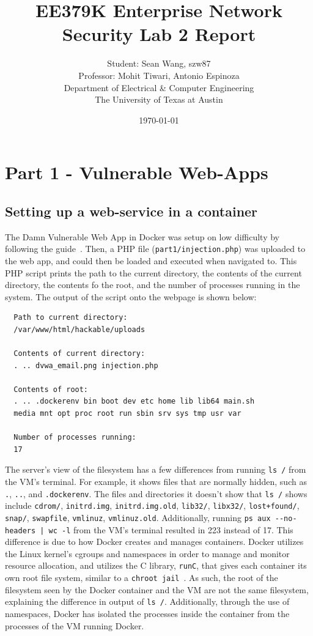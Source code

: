 \documentclass[11pt]{article}
\author{Student: Sean Wang, szw87 \\ Professor: Mohit Tiwari, Antonio Espinoza \\ Department of Electrical \& Computer Engineering \\ The University of Texas at Austin}
\date{\today}
\title{EE379K Enterprise Network Security Lab 2 Report}
\begin{document}
\maketitle
\section*{Part 1 - Vulnerable Web-Apps}
\subsection*{Setting up a web-service in a container}
The Damn Vulnerable Web App in Docker was setup on low difficulty by following the guide~\cite{dvwa}. Then, a
PHP file (\verb|part1/injection.php|) was uploaded to the web app, and could then be loaded and executed when navigated to. This PHP script
prints the path to the current directory, the contents of the current directory, the contents fo the root, and the number of processes
running in the system. The output of the script onto the webpage is shown below:
\begin{verbatim}
  Path to current directory:
  /var/www/html/hackable/uploads
  
  Contents of current directory:
  . .. dvwa_email.png injection.php
  
  Contents of root:
  . .. .dockerenv bin boot dev etc home lib lib64 main.sh
  media mnt opt proc root run sbin srv sys tmp usr var
  
  Number of processes running:
  17
\end{verbatim}

The server's view of the filesystem has a few differences from running \verb|ls /| from the VM's terminal. For example, it shows files
that are normally hidden, such as \verb|.|, \verb|..|, and \verb|.dockerenv|. The files and directories it doesn't show that
\verb|ls /| shows include \verb|cdrom/|, \verb|initrd.img|, \verb|initrd.img.old|, \verb|lib32/|, \verb|libx32/|, \verb|lost+found/|,
\verb|snap/|, \verb|swapfile|, \verb|vmlinuz|, \verb|vmlinuz.old|. Additionally, running \verb=ps aux --no-headers | wc -l= from the
VM's terminal resulted in 223 instead of 17. This difference is due to how Docker creates and manages containers. Docker utilizes the
Linux kernel's cgroups and namespaces in order to manage and monitor resource allocation, and utilizes the C library, \verb|runC|,
that gives each container its own root file system, similar to a \verb|chroot jail|~\cite{codementor,demystify}. As such, the root of
the filesystem seen by the Docker container and the VM are not the same filesystem, explaining the difference in output of \verb|ls /|.
Additionally, through the use of namespaces, Docker has isolated the processes inside the container from the processes of the VM
running Docker.
\end{document}
